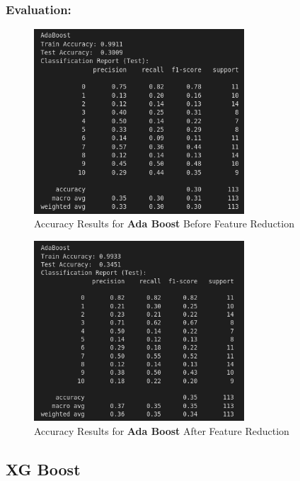 \documentclass[a4paper,12pt]{article}
\begin{document}
\subsubsection{Evaluation:}
\begin{figure}[H]
    \centering
    \includegraphics[width=0.7\textwidth]{./images/adaacc1.png}
    \caption{Accuracy Results for \textbf{Ada Boost} Before Feature Reduction}
    \label{fig:fig_21}
\end{figure}
\begin{figure}[H]
    \centering
    \includegraphics[width=0.7\textwidth]{./images/adaacc2.png}
    \caption{Accuracy Results for \textbf{Ada Boost} After Feature Reduction}
    \label{fig:fig_22}
\end{figure}

\subsection{XG Boost}
\end{document}
